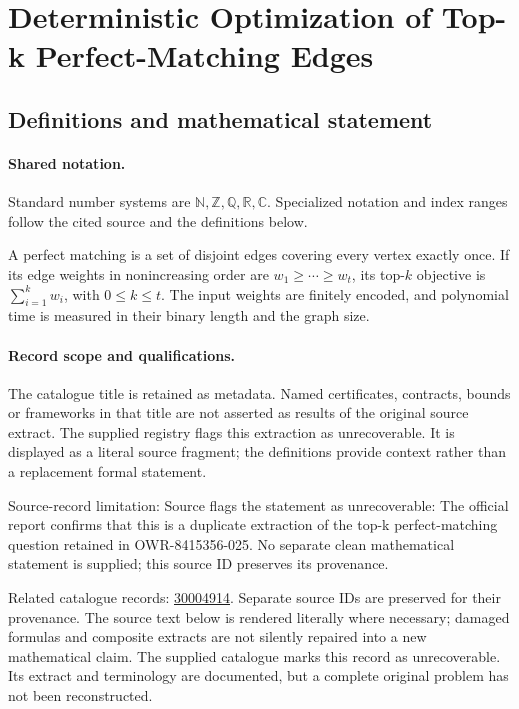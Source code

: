 \documentclass[11pt]{article}
\begin{document}
\section{Deterministic Optimization of Top-k Perfect-Matching Edges}\label{statement}

\subsection{Definitions and mathematical statement}

\paragraph{Shared notation.}Standard number systems are $\mathbb N,\mathbb Z,\mathbb Q,\mathbb R,\mathbb C$. Specialized notation and index ranges follow the cited source and the definitions below.


A perfect matching is a set of disjoint edges covering every vertex exactly once. If its edge weights in nonincreasing order are $w_1\geq\cdots\geq w_t$, its top-$k$ objective is $\sum_{i=1}^kw_i$, with $0\leq k\leq t$. The input weights are finitely encoded, and polynomial time is measured in their binary length and the graph size.
\paragraph{Record scope and qualifications.}
The catalogue title is retained as metadata. Named certificates, contracts, bounds or frameworks in that title are not asserted as results of the original source extract.
The supplied registry flags this extraction as unrecoverable. It is displayed as a literal source fragment; the definitions provide context rather than a replacement formal statement.

Source-record limitation: Source flags the statement as unrecoverable: The official report confirms that this is a duplicate extraction of the top-k perfect-matching question retained in OWR-8415356-025. No separate clean mathematical statement is supplied; this source ID preserves its provenance.

Related catalogue records: \href{https://mehmetmars7.github.io/Erdosproblems-llm-hunter/problem.html?type=open_problems&id=30004914}{30004914}. Separate source IDs are preserved for their provenance.
The source text below is rendered literally where necessary; damaged formulas and composite extracts are not silently repaired into a new mathematical claim.
The supplied catalogue marks this record as unrecoverable. Its extract and terminology are documented, but a complete original problem has not been reconstructed.
\end{document}
